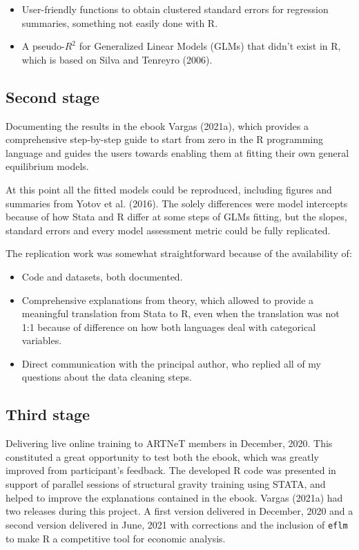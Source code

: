 \documentclass[12pt,reqno,oneside,pdftex]{formato-puc/puctesis} %
\providecommand{\tightlist}{%
  \setlength{\itemsep}{0pt}\setlength{\parskip}{0pt}}
\begin{document}
\begin{itemize}
\tightlist
\item
  User-friendly functions to obtain clustered standard errors for
  regression summaries, something not easily done with R.
\item
  A pseudo-\(R^2\) for Generalized Linear Models (GLMs) that didn't
  exist in R, which is based on Silva and Tenreyro (2006).
\end{itemize}

\hypertarget{second-stage}{%
\subsection{Second stage}\label{second-stage}}

Documenting the results in the ebook Vargas (2021a), which provides a
comprehensive step-by-step guide to start from zero in the R programming
language and guides the users towards enabling them at fitting their own
general equilibrium models.

At this point all the fitted models could be reproduced, including
figures and summaries from Yotov et al. (2016). The solely differences
were model intercepts because of how Stata and R differ at some steps of
GLMs fitting, but the slopes, standard errors and every model assessment
metric could be fully replicated.

The replication work was somewhat straightforward because of the
availability of:

\begin{itemize}
\tightlist
\item
  Code and datasets, both documented.
\item
  Comprehensive explanations from theory, which allowed to provide a
  meaningful translation from Stata to R, even when the translation was
  not 1:1 because of difference on how both languages deal with
  categorical variables.
\item
  Direct communication with the principal author, who replied all of my
  questions about the data cleaning steps.
\end{itemize}

\hypertarget{third-stage}{%
\subsection{Third stage}\label{third-stage}}

Delivering live online training to ARTNeT members in December, 2020.
This constituted a great opportunity to test both the ebook, which was
greatly improved from participant's feedback. The developed R code was
presented in support of parallel sessions of structural gravity training
using STATA, and helped to improve the explanations contained in the
ebook. Vargas (2021a) had two releases during this project. A first
version delivered in December, 2020 and a second version delivered in
June, 2021 with corrections and the inclusion of \texttt{eflm} to make R
a competitive tool for economic analysis.
\end{document}
